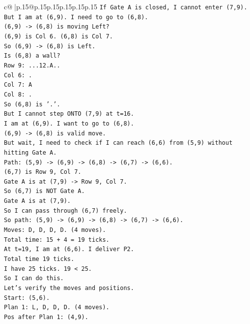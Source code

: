 \documentclass{article}
\begin{document}
{\begin{supertabular}{c@{$\;$}|p{.15\linewidth}@{}p{.15\linewidth}p{.15\linewidth}p{.15\linewidth}p{.15\linewidth}p{.15\linewidth}}
{{{\texttt{If Gate A is closed, I cannot enter (7,9).} \\
\texttt{But I am at (6,9). I need to go to (6,8).} \\
\texttt{(6,9) {-}> (6,8) is moving Left?} \\
\texttt{(6,9) is Col 6. (6,8) is Col 7.} \\
\texttt{So (6,9) {-}> (6,8) is Left.} \\
\texttt{Is (6,8) a wall?} \\
\texttt{Row 9: ...12.A..} \\
\texttt{Col 6: .} \\
\texttt{Col 7: A} \\
\texttt{Col 8: .} \\
\texttt{So (6,8) is '.'.} \\
\texttt{But I cannot step ONTO (7,9) at t=16.} \\
\texttt{I am at (6,9). I want to go to (6,8).} \\
\texttt{(6,9) {-}> (6,8) is valid move.} \\
\texttt{But wait, I need to check if I can reach (6,6) from (5,9) without hitting Gate A.} \\
\texttt{Path: (5,9) {-}> (6,9) {-}> (6,8) {-}> (6,7) {-}> (6,6).} \\
\texttt{(6,7) is Row 9, Col 7.} \\
\texttt{Gate A is at (7,9) {-}> Row 9, Col 7.} \\
\texttt{So (6,7) is NOT Gate A.} \\
\texttt{Gate A is at (7,9).} \\
\texttt{So I can pass through (6,7) freely.} \\
\texttt{So path: (5,9) {-}> (6,9) {-}> (6,8) {-}> (6,7) {-}> (6,6).} \\
\texttt{Moves: D, D, D, D. (4 moves).} \\
\texttt{Total time: 15 + 4 = 19 ticks.} \\
\texttt{At t=19, I am at (6,6). I deliver P2.} \\
\texttt{Total time 19 ticks.} \\
\texttt{I have 25 ticks. 19 < 25.} \\
\texttt{So I can do this.} \\
\texttt{Let's verify the moves and positions.} \\
\texttt{Start: (5,6).} \\
\texttt{Plan 1: L, D, D, D. (4 moves).} \\
\texttt{Pos after Plan 1: (4,9).} \\
}}}
\end{supertabular}}
\end{document}
